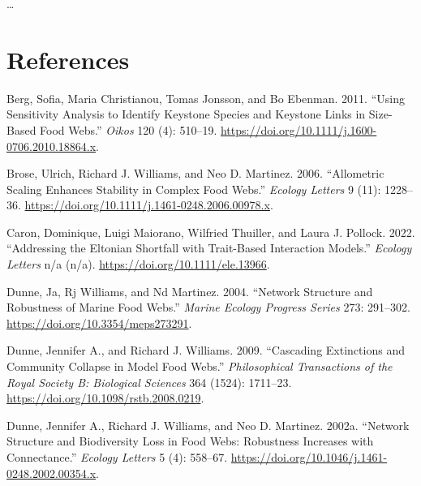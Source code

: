 \documentclass{article}
\newlength{\cslhangindent}
\newlength{\cslentryspacingunit} %
\newenvironment{CSLReferences}[2] %
 {%
  \setlength{\parindent}{0pt}
  \ifodd #1
  \let\oldpar\par
  \def\par{\hangindent=\cslhangindent\oldpar}
  \fi
  \setlength{\parskip}{#2\cslentryspacingunit}
 }%
 {}
\begin{document}
\ldots{}

\hypertarget{references}{%
\section*{References}\label{references}}

\hypertarget{refs}{}
\begin{CSLReferences}{1}{0}
\leavevmode{}%
Berg, Sofia, Maria Christianou, Tomas Jonsson, and Bo Ebenman. 2011.
{``Using Sensitivity Analysis to Identify Keystone Species and Keystone
Links in Size-Based Food Webs.''} \emph{Oikos} 120 (4): 510--19.
\url{https://doi.org/10.1111/j.1600-0706.2010.18864.x}.

\leavevmode{}%
Brose, Ulrich, Richard J. Williams, and Neo D. Martinez. 2006.
{``Allometric Scaling Enhances Stability in Complex Food Webs.''}
\emph{Ecology Letters} 9 (11): 1228--36.
\url{https://doi.org/10.1111/j.1461-0248.2006.00978.x}.

\leavevmode{}%
Caron, Dominique, Luigi Maiorano, Wilfried Thuiller, and Laura J.
Pollock. 2022. {``Addressing the {Eltonian} Shortfall with Trait-Based
Interaction Models.''} \emph{Ecology Letters} n/a (n/a).
\url{https://doi.org/10.1111/ele.13966}.

\leavevmode{}%
Dunne, Ja, Rj Williams, and Nd Martinez. 2004. {``Network Structure and
Robustness of Marine Food Webs.''} \emph{Marine Ecology Progress Series}
273: 291--302. \url{https://doi.org/10.3354/meps273291}.

\leavevmode{}%
Dunne, Jennifer A., and Richard J. Williams. 2009. {``Cascading
Extinctions and Community Collapse in Model Food Webs.''}
\emph{Philosophical Transactions of the Royal Society B: Biological
Sciences} 364 (1524): 1711--23.
\url{https://doi.org/10.1098/rstb.2008.0219}.

\leavevmode{}%
Dunne, Jennifer A., Richard J. Williams, and Neo D. Martinez. 2002a.
{``Network Structure and Biodiversity Loss in Food Webs: Robustness
Increases with Connectance.''} \emph{Ecology Letters} 5 (4): 558--67.
\url{https://doi.org/10.1046/j.1461-0248.2002.00354.x}.


\end{CSLReferences}
\end{document}
